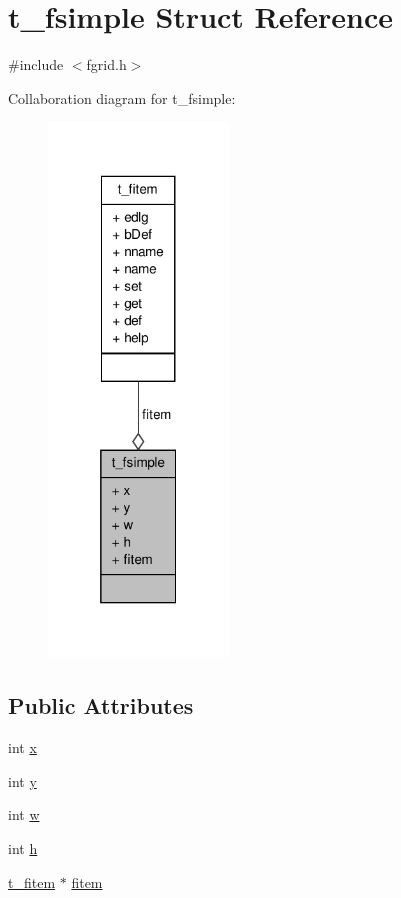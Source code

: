 \hypertarget{structt__fsimple}{\section{t\-\_\-fsimple \-Struct \-Reference}
\label{structt__fsimple}
}


{\ttfamily \#include $<$fgrid.\-h$>$}



\-Collaboration diagram for t\-\_\-fsimple\-:
\nopagebreak
\begin{figure}[H]
\begin{center}
\leavevmode
\includegraphics[width=136pt]{structt__fsimple__coll__graph}
\end{center}
\end{figure}
\subsection*{\-Public \-Attributes}
\begin{DoxyCompactItemize}
\item 
int \hyperlink{structt__fsimple_aaeeae2ff3b1a1a965b8020da30a44535}{x}
\item 
int \hyperlink{structt__fsimple_a9631da57036ef58c074ced17f3f29c8d}{y}
\item 
int \hyperlink{structt__fsimple_aa0a6be92aa6170a4cbd7b3bc5bbb109b}{w}
\item 
int \hyperlink{structt__fsimple_ae1cc724721ce7d919a126f6aea73f5b9}{h}
\item 
\hyperlink{structt__fitem}{t\-\_\-fitem} $\ast$ \hyperlink{structt__fsimple_a17a2cb9ea780b6153c34846e1e1762d0}{fitem}
\end{DoxyCompactItemize}


